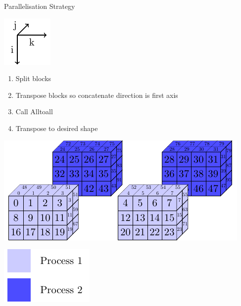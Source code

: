 \documentclass{beamer}
\begin{document}
\begin{frame}{Parallelisation Strategy}
 \begin{minipage}{.3\textwidth}
 \includegraphics[width=.4\textwidth]{SplitConcat3D/Axes}
 \vspace{1em}
 
  \begin{enumerate}
   \item Split blocks 
   \item Transpose blocks so concatenate direction is first axis
   \item Call Alltoall
   \item Transpose to desired shape
  \end{enumerate}
  
  \vspace{1em}
 \end{minipage}
 \begin{minipage}{.65\textwidth}
  \includegraphics[width=\textwidth]{SplitConcat3D/TransposedSendBlocks}
  
  \vspace{1em}
  
  \hfill\includegraphics[width=.3\textwidth]{SplitConcat3D/Legend}
 \end{minipage}
\end{frame}
\end{document}
